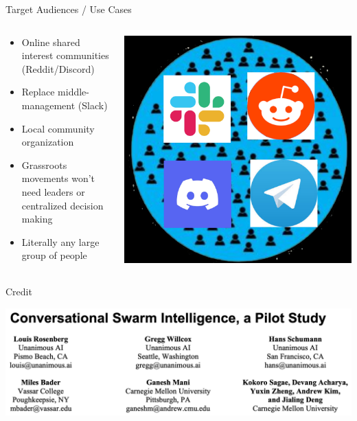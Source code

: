\documentclass[aspectratio=169]{beamer}
\begin{document}
\begin{frame}{Target Audiences / Use Cases}
\begin{columns}[T]
    \begin{column}[T]{0.5\textwidth}
        \begin{itemize}
            \item Online shared interest communities (Reddit/Discord)
            \item Replace middle-management (Slack)
            \item Local community organization
            \item Grassroots movements won't need leaders or centralized decision making
            \item Literally any large group of people
        \end{itemize}
    \end{column}
    \begin{column}{0.5\textwidth}
        \includegraphics[height=0.8\textheight]{imgs/CSI_section/competition.png}
    \end{column}
\end{columns}
\end{frame}

\begin{frame}{Credit}
\vspace{-0.5in}
\begin{center}
\includegraphics[width=\textwidth]{imgs/CSI_section/authors.png}
\end{center}
\end{frame}
\end{document}
